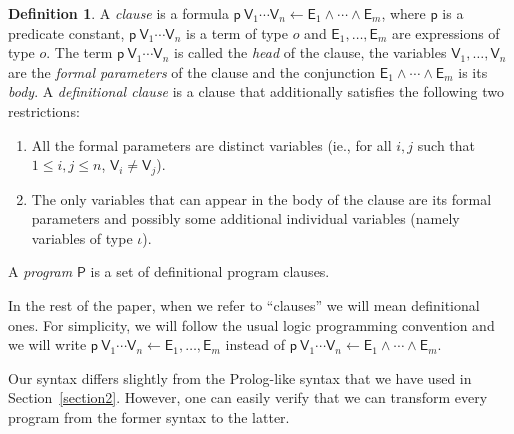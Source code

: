 \documentclass[submission,copyright]{eptcs}
\theoremstyle{definition}
\newtheorem{definition}{Definition}
\begin{document}
\begin{definition}
A {\em clause} is a formula $\mathsf{p}\ \mathsf{V}_1 \cdots \mathsf{V}_n \leftarrow \mathsf{E}_1 \wedge\cdots \wedge \mathsf{E}_m$,
where $\mathsf{p}$ is a predicate constant, $\mathsf{p}\ \mathsf{V}_1\cdots\mathsf{V}_n$
is a term of type $o$ and $\mathsf{E}_1,\ldots,\mathsf{E}_m$ are expressions
of type $o$. The term $\mathsf{p}\ \mathsf{V}_1 \cdots \mathsf{V}_n$ is called the {\em head} of the
clause, the variables $\mathsf{V}_1, \ldots, \mathsf{V}_n$ are the {\em formal parameters} of the
clause and the conjunction $\mathsf{E}_1 \wedge\cdots \wedge \mathsf{E}_m$ is its {\em body}.
A {\em definitional clause} is a clause that additionally satisfies the following
two restrictions:
\begin{enumerate}
\item All the formal parameters are distinct variables (ie., for all $i,j$ such that $1\leq i,j\leq n$,
      $\mathsf{V}_i \neq \mathsf{V}_j$).

\item The only variables that can appear in the body of the clause are its formal parameters
      and possibly some additional individual variables (namely variables of type $\iota$).
\end{enumerate}
A {\em program} $\mathsf{P}$ is a set of definitional program clauses.
\end{definition}
In the rest of the paper, when we refer to ``clauses'' we will mean definitional ones.
For simplicity, we will follow the usual logic programming convention and we will write
$\mathsf{p}\ \mathsf{V}_1 \cdots \mathsf{V}_n \leftarrow \mathsf{E}_1,\ldots,\mathsf{E}_m$
instead of $\mathsf{p}\ \mathsf{V}_1 \cdots \mathsf{V}_n \leftarrow \mathsf{E}_1 \wedge\cdots \wedge \mathsf{E}_m$.



Our syntax differs slightly from the Prolog-like syntax that we have used in Section~\ref{section2}.
However, one can easily verify that we can transform every program from the former syntax to the latter.
\end{document}
